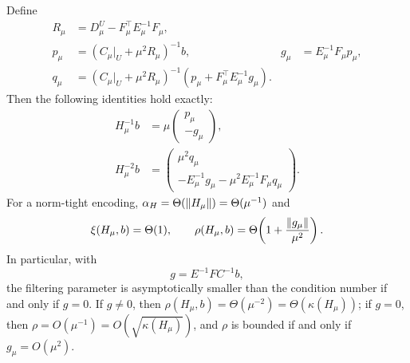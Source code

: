 \begin{theorem}
\label{thm:dls-coupling}
Define
\begin{align}
 R_\mu&=D_\mu^U-F_\mu^\top E_\mu^{-1}F_\mu,\nonumber\\
 p_\mu&=(C_\mu|_U+\mu^2R_\mu)^{-1}b,
 &g_\mu&=E_\mu^{-1}F_\mu p_\mu,\label{eq:coupling-pg}\\
 q_\mu&=(C_\mu|_U+\mu^2R_\mu)^{-1}
 (p_\mu+F_\mu^\top E_\mu^{-1}g_\mu).\nonumber
\end{align}
Then the following identities hold exactly:
\begin{align}
 H_\mu^{-1}b
 &=\mu\begin{pmatrix}p_\mu\\-g_\mu\end{pmatrix},
 \label{eq:coupling-first-inverse}\\
 H_\mu^{-2}b
 &=\begin{pmatrix}
       \mu^2q_\mu\\
       -E_\mu^{-1}g_\mu-\mu^2E_\mu^{-1}F_\mu q_\mu
    \end{pmatrix}.
 \label{eq:coupling-second-inverse}
\end{align}
For a norm-tight encoding,
$\alpha_H=\Theta(\lVert H_\mu\rVert)=\Theta(\mu^{-1})$ and
\begin{equation}
 \xi(H_\mu,b)=\Theta(1),\qquad
 \rho(H_\mu,b)=\Theta\!\left(1+\frac{\lVert g_\mu\rVert}{\mu^2}\right).
 \label{eq:coupling-filtering-law}
\end{equation}
In particular, with
\begin{equation}
 g=E^{-1}FC^{-1}b,
 \label{eq:limiting-coupling}
\end{equation}
the filtering parameter is asymptotically smaller than the condition
number if and only if $g=0$.  If $g\ne0$, then
$\rho(H_\mu,b)=\Theta(\mu^{-2})=\Theta(\kappa(H_\mu))$; if $g=0$, then
$\rho=O(\mu^{-1})=O(\sqrt{\kappa(H_\mu)})$, and $\rho$ is bounded if and only
if $g_\mu=O(\mu^2)$.
\end{theorem}

